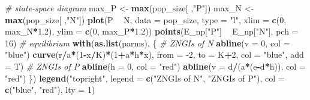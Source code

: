 \documentclass[
]{book}
\newenvironment{Shaded}{\begin{snugshade}}{\end{snugshade}}
\newcommand{\CommentTok}[1]{\textcolor[rgb]{0.56,0.35,0.01}{\textit{#1}}}
\newcommand{\DataTypeTok}[1]{\textcolor[rgb]{0.13,0.29,0.53}{#1}}
\newcommand{\DecValTok}[1]{\textcolor[rgb]{0.00,0.00,0.81}{#1}}
\newcommand{\FloatTok}[1]{\textcolor[rgb]{0.00,0.00,0.81}{#1}}
\newcommand{\KeywordTok}[1]{\textcolor[rgb]{0.13,0.29,0.53}{\textbf{#1}}}
\newcommand{\NormalTok}[1]{#1}
\newcommand{\OperatorTok}[1]{\textcolor[rgb]{0.81,0.36,0.00}{\textbf{#1}}}
\newcommand{\StringTok}[1]{\textcolor[rgb]{0.31,0.60,0.02}{#1}}
\begin{document}
\begin{Shaded}
\begin{Highlighting}[]
\CommentTok{# state-space diagram}
\NormalTok{max_P <-}\StringTok{ }\KeywordTok{max}\NormalTok{(pop_size[ ,}\StringTok{"P"}\NormalTok{])}
\NormalTok{max_N <-}\StringTok{ }\KeywordTok{max}\NormalTok{(pop_size[ ,}\StringTok{"N"}\NormalTok{])}
\KeywordTok{plot}\NormalTok{(P }\OperatorTok{~}\StringTok{ }\NormalTok{N, }\DataTypeTok{data =}\NormalTok{ pop_size, }\DataTypeTok{type =} \StringTok{"l"}\NormalTok{, }\DataTypeTok{xlim =} \KeywordTok{c}\NormalTok{(}\DecValTok{0}\NormalTok{, max_N}\OperatorTok{*}\FloatTok{1.2}\NormalTok{), }\DataTypeTok{ylim =} \KeywordTok{c}\NormalTok{(}\DecValTok{0}\NormalTok{, max_P}\OperatorTok{*}\FloatTok{1.2}\NormalTok{))}
\KeywordTok{points}\NormalTok{(E_np[}\StringTok{"P"}\NormalTok{] }\OperatorTok{~}\StringTok{ }\NormalTok{E_np[}\StringTok{"N"}\NormalTok{], }\DataTypeTok{pch =} \DecValTok{16}\NormalTok{) }\CommentTok{# equilibrium }
\KeywordTok{with}\NormalTok{(}\KeywordTok{as.list}\NormalTok{(parms), \{}
  \CommentTok{# ZNGIs of N}
  \KeywordTok{abline}\NormalTok{(}\DataTypeTok{v =} \DecValTok{0}\NormalTok{, }\DataTypeTok{col =} \StringTok{"blue"}\NormalTok{)}
  \KeywordTok{curve}\NormalTok{(r}\OperatorTok{/}\NormalTok{a}\OperatorTok{*}\NormalTok{(}\DecValTok{1}\OperatorTok{-}\NormalTok{x}\OperatorTok{/}\NormalTok{K)}\OperatorTok{*}\NormalTok{(}\DecValTok{1}\OperatorTok{+}\NormalTok{a}\OperatorTok{*}\NormalTok{h}\OperatorTok{*}\NormalTok{x), }\DataTypeTok{from =} \DecValTok{-2}\NormalTok{, }\DataTypeTok{to =}\NormalTok{ K}\OperatorTok{+}\DecValTok{2}\NormalTok{, }\DataTypeTok{col =} \StringTok{"blue"}\NormalTok{, }\DataTypeTok{add =}\NormalTok{ T)}
  \CommentTok{# ZNGIs of P}
  \KeywordTok{abline}\NormalTok{(}\DataTypeTok{h =} \DecValTok{0}\NormalTok{, }\DataTypeTok{col =} \StringTok{"red"}\NormalTok{)}
  \KeywordTok{abline}\NormalTok{(}\DataTypeTok{v =}\NormalTok{ d}\OperatorTok{/}\NormalTok{(a}\OperatorTok{*}\NormalTok{(e}\OperatorTok{-}\NormalTok{d}\OperatorTok{*}\NormalTok{h)), }\DataTypeTok{col =} \StringTok{"red"}\NormalTok{)}
\NormalTok{  \}) }
\KeywordTok{legend}\NormalTok{(}\StringTok{"topright"}\NormalTok{, }\DataTypeTok{legend =} \KeywordTok{c}\NormalTok{(}\StringTok{"ZNGIs of N"}\NormalTok{, }\StringTok{"ZNGIs of P"}\NormalTok{), }\DataTypeTok{col =} \KeywordTok{c}\NormalTok{(}\StringTok{"blue"}\NormalTok{, }\StringTok{"red"}\NormalTok{), }\DataTypeTok{lty =} \DecValTok{1}\NormalTok{)}
\end{Highlighting}
\end{Shaded}
\end{document}
